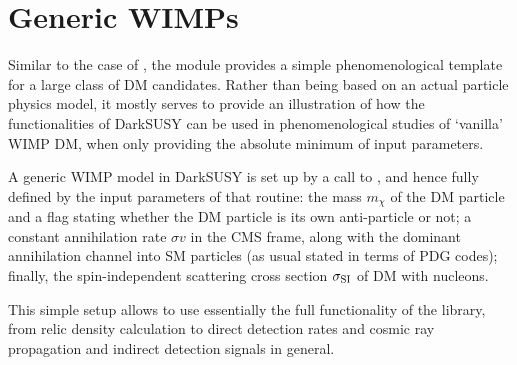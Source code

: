 \chapter{Generic WIMPs}
\label{ch:genWIMP}

Similar to the case of , the module  provides 
a simple phenomenological template for a large class of DM candidates. Rather than being based 
on an actual particle physics model, it mostly serves to provide an illustration of how the functionalities 
of DarkSUSY can be used in phenomenological studies of ‘vanilla’ WIMP DM, when only providing 
the absolute minimum of input parameters.

A generic WIMP model in DarkSUSY is set up by a call to , 
and hence fully defined by the input parameters of that routine: the mass $m_\chi$ of the DM particle 
and a flag stating whether the DM particle is its own anti-particle or not; a constant annihilation 
rate $\sigma v$ in the CMS frame, along with the dominant annihilation channel into SM particles
(as usual stated in terms of PDG codes); finally, the spin-independent 
scattering cross section $\sigma_{\rm SI}$ of DM with nucleons.

This simple setup allows to use essentially the full functionality of the  library,
from relic density calculation to direct detection rates and cosmic ray propagation and
indirect detection signals in general.
